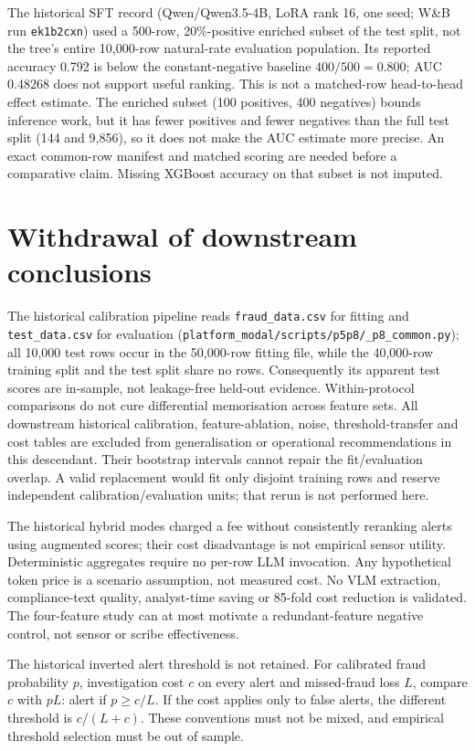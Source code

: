 \documentclass[11pt]{article}
\begin{document}
The historical SFT record (Qwen/Qwen3.5-4B, LoRA rank 16, one seed; W\&B run
\texttt{ek1b2cxn}) used a 500-row, 20\%-positive enriched subset of the test
split, not the tree's entire 10,000-row natural-rate evaluation population.
Its reported accuracy 0.792 is below the constant-negative baseline
$400/500=0.800$; AUC 0.48268 does not support useful ranking. This is not a
matched-row head-to-head effect estimate. The enriched subset (100 positives,
400 negatives) bounds inference work, but it has fewer positives and fewer
negatives than the full test split (144 and 9,856), so it does not make the
AUC estimate more precise.
An exact common-row manifest and matched scoring are needed before a
comparative claim. Missing XGBoost accuracy on that subset is not imputed.
\section{Withdrawal of downstream conclusions}
The historical calibration pipeline reads \texttt{fraud\_data.csv} for fitting
and \texttt{test\_data.csv} for evaluation
(\texttt{platform\_modal/scripts/p5p8/\_p8\_common.py}); all 10,000 test rows
occur in the 50,000-row fitting file, while the 40,000-row training split and
the test split share no rows. Consequently its apparent test scores are in-sample, not leakage-free
held-out evidence. Within-protocol comparisons do not cure differential
memorisation across feature sets. All downstream historical calibration,
feature-ablation, noise, threshold-transfer and cost tables are excluded
from generalisation or operational recommendations in this descendant.
Their bootstrap intervals cannot repair the fit/evaluation overlap.
A valid replacement would fit only disjoint training rows and reserve
independent calibration/evaluation units; that rerun is not performed here.

The historical hybrid modes charged a fee without consistently reranking
alerts using augmented scores; their cost disadvantage is not empirical
sensor utility. Deterministic aggregates require no per-row LLM invocation.
Any hypothetical token price is a scenario assumption, not measured cost.
No VLM extraction, compliance-text quality, analyst-time saving or 85-fold
cost reduction is validated. The four-feature study can at most motivate a
redundant-feature negative control, not sensor or scribe effectiveness.

The historical inverted alert threshold is not retained. For calibrated fraud
probability $p$, investigation cost $c$ on every alert and missed-fraud loss
$L$, compare $c$ with $pL$: alert if $p\ge c/L$. If the cost applies only to
false alerts, the different threshold is $c/(L+c)$. These conventions must not
be mixed, and empirical threshold selection must be out of sample.
\end{document}
